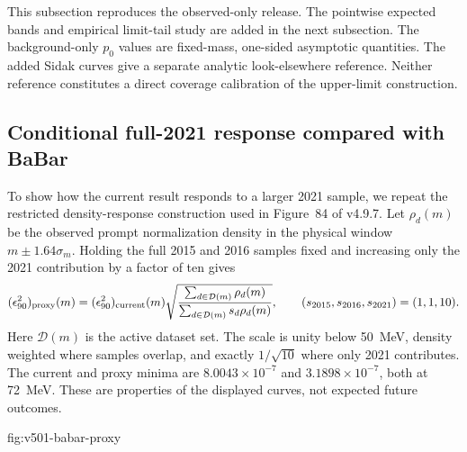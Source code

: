 This subsection reproduces the observed-only release. The pointwise expected
bands and empirical limit-tail study are added in the next subsection. The background-only $p_0$ values are fixed-mass, one-sided asymptotic
quantities. The added Sidak curves give a separate analytic look-elsewhere
reference. Neither reference constitutes a direct coverage calibration of the
upper-limit construction.



\subsection{Conditional full-2021 response compared with BaBar}
\label{sec:v501-babar-proxy}
To show how the current result responds to a larger 2021 sample, we repeat
the restricted density-response construction used in Figure~84 of v4.9.7.
Let $\rho_d(m)$ be the observed prompt normalization density in the physical
window $m\pm1.64\sigma_m$. Holding the full 2015 and 2016 samples fixed and
increasing only the 2021 contribution by a factor of ten gives
\begin{equation}
 (\epsilon^2_{90})_{\rm proxy}(m)
 = (\epsilon^2_{90})_{\rm current}(m)
 \sqrt{\frac{\sum_{d\in\mathcal D(m)}\rho_d(m)}
 {\sum_{d\in\mathcal D(m)}s_d\rho_d(m)}} ,
 \qquad (s_{2015},s_{2016},s_{2021})=(1,1,10).
 \label{eq:v501-density-proxy}
\end{equation}
Here $\mathcal D(m)$ is the active dataset set. The scale is unity below
50~MeV, density weighted where samples overlap, and exactly $1/\sqrt{10}$
where only 2021 contributes. The current and proxy minima are
$8.0043\times10^{-7}$ and $3.1898\times10^{-7}$, both at 72~MeV.
These are properties of the displayed curves, not expected future outcomes.

{fig:v501-babar-proxy}
\FloatBarrier

